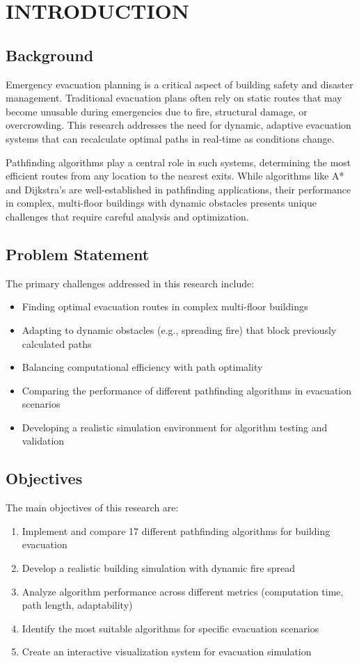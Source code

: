 \documentclass[11pt,a4paper]{report}
\begin{document}
\chapter{INTRODUCTION}

\section{Background}
Emergency evacuation planning is a critical aspect of building safety and disaster management. Traditional evacuation plans often rely on static routes that may become unusable during emergencies due to fire, structural damage, or overcrowding. This research addresses the need for dynamic, adaptive evacuation systems that can recalculate optimal paths in real-time as conditions change.

Pathfinding algorithms play a central role in such systems, determining the most efficient routes from any location to the nearest exits. While algorithms like A* and Dijkstra's are well-established in pathfinding applications, their performance in complex, multi-floor buildings with dynamic obstacles presents unique challenges that require careful analysis and optimization.

\section{Problem Statement}
The primary challenges addressed in this research include:
\begin{itemize}
    \item Finding optimal evacuation routes in complex multi-floor buildings
    \item Adapting to dynamic obstacles (e.g., spreading fire) that block previously calculated paths
    \item Balancing computational efficiency with path optimality
    \item Comparing the performance of different pathfinding algorithms in evacuation scenarios
    \item Developing a realistic simulation environment for algorithm testing and validation
\end{itemize}

\section{Objectives}
The main objectives of this research are:
\begin{enumerate}
    \item Implement and compare 17 different pathfinding algorithms for building evacuation
    \item Develop a realistic building simulation with dynamic fire spread
    \item Analyze algorithm performance across different metrics (computation time, path length, adaptability)
    \item Identify the most suitable algorithms for specific evacuation scenarios
    \item Create an interactive visualization system for evacuation simulation
\end{enumerate}
\end{document}
